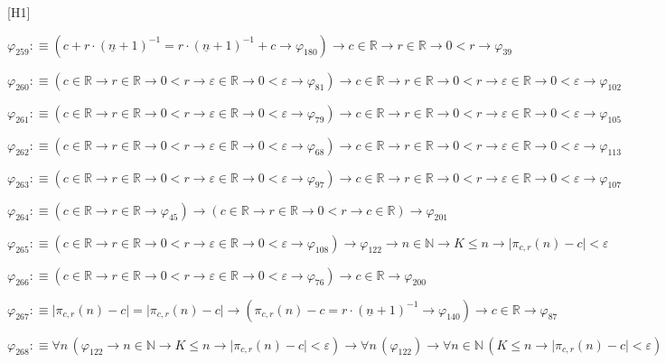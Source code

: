 \begin{fullproof}{[H1]}
\begin{abbrevlist}
\item $\varphi_{259} :\equiv (c + r \cdot (\underline{n} + 1)^{-1} = r \cdot (\underline{n} + 1)^{-1} + c \to \varphi_{180}) \to c \in \mathbb{R} \to r \in \mathbb{R} \to 0 < r \to \varphi_{39}$
\item $\varphi_{260} :\equiv (c \in \mathbb{R} \to r \in \mathbb{R} \to 0 < r \to \varepsilon \in \mathbb{R} \to 0 < \varepsilon \to \varphi_{81}) \to c \in \mathbb{R} \to r \in \mathbb{R} \to 0 < r \to \varepsilon \in \mathbb{R} \to 0 < \varepsilon \to \varphi_{102}$
\item $\varphi_{261} :\equiv (c \in \mathbb{R} \to r \in \mathbb{R} \to 0 < r \to \varepsilon \in \mathbb{R} \to 0 < \varepsilon \to \varphi_{79}) \to c \in \mathbb{R} \to r \in \mathbb{R} \to 0 < r \to \varepsilon \in \mathbb{R} \to 0 < \varepsilon \to \varphi_{105}$
\item $\varphi_{262} :\equiv (c \in \mathbb{R} \to r \in \mathbb{R} \to 0 < r \to \varepsilon \in \mathbb{R} \to 0 < \varepsilon \to \varphi_{68}) \to c \in \mathbb{R} \to r \in \mathbb{R} \to 0 < r \to \varepsilon \in \mathbb{R} \to 0 < \varepsilon \to \varphi_{113}$
\item $\varphi_{263} :\equiv (c \in \mathbb{R} \to r \in \mathbb{R} \to 0 < r \to \varepsilon \in \mathbb{R} \to 0 < \varepsilon \to \varphi_{97}) \to c \in \mathbb{R} \to r \in \mathbb{R} \to 0 < r \to \varepsilon \in \mathbb{R} \to 0 < \varepsilon \to \varphi_{107}$
\item $\varphi_{264} :\equiv (c \in \mathbb{R} \to r \in \mathbb{R} \to \varphi_{45}) \to (c \in \mathbb{R} \to r \in \mathbb{R} \to 0 < r \to c \in \mathbb{R}) \to \varphi_{201}$
\item $\varphi_{265} :\equiv (c \in \mathbb{R} \to r \in \mathbb{R} \to 0 < r \to \varepsilon \in \mathbb{R} \to 0 < \varepsilon \to \varphi_{108}) \to \varphi_{122} \to n \in \mathbb{N} \to K \leq n \to \lvert \pi_{c,r}(n) - c \rvert < \varepsilon$
\item $\varphi_{266} :\equiv (c \in \mathbb{R} \to r \in \mathbb{R} \to 0 < r \to \varepsilon \in \mathbb{R} \to 0 < \varepsilon \to \varphi_{76}) \to c \in \mathbb{R} \to \varphi_{200}$
\item $\varphi_{267} :\equiv \lvert \pi_{c,r}(n) - c \rvert = \lvert \pi_{c,r}(n) - c \rvert \to (\pi_{c,r}(n) - c = r \cdot (\underline{n} + 1)^{-1} \to \varphi_{140}) \to c \in \mathbb{R} \to \varphi_{87}$
\item $\varphi_{268} :\equiv \forall n\,(\varphi_{122} \to n \in \mathbb{N} \to K \leq n \to \lvert \pi_{c,r}(n) - c \rvert < \varepsilon) \to \forall n\,(\varphi_{122}) \to \forall n \in \mathbb{N}\,(K \leq n \to \lvert \pi_{c,r}(n) - c \rvert < \varepsilon)$

\end{abbrevlist}
\end{fullproof}
